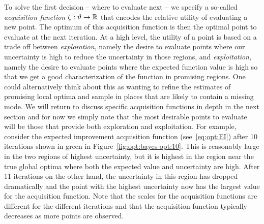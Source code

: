 To solve the first decision -- where to evaluate next -- we specify a so-called 
\emph{acquisition function}  $\zeta : \vartheta \rightarrow \mathbb{R}$
that encodes the relative utility of evaluating a new point.  The optimum of this
acquisition function is then the optimal point to evaluate at the next iteration.
At a high level, the utility
of a point is based on a trade off between \emph{exploration},
namely the desire to evaluate points where our uncertainty is high to reduce the
uncertainty in those regions, and \emph{exploitation}, namely the desire to evaluate points
where the expected function value is high so that we get a good characterization
of the function in promising regions.  One could alternatively think about this as wanting to refine 
the estimates of promising local optima and sample in places that are likely to contain a
missing mode.
We will return to discuss specific acquisition
functions in depth in the next section and for now we simply note that the most
desirable points to evaluate will be those that provide both exploration and exploitation.
For example, consider the expected improvement acquisition function (see~\eqref{eq:opt:EI})
after 10 iterations shown in green in Figure~\ref{fig:opt:bayes-opt:10}.  This is reasonably
large in the two regions of highest uncertainty, but it is highest in the region near the 
true global optima where both
the expected value and uncertainty are high.  After 11 iterations on the other hand,
the uncertainty in this region has dropped dramatically and the point with the
highest uncertainty now has the largest value for the acquisition function.  Note that
the scales for the acquisition functions are different for the different iterations and
that the acquisition function typically decreases as more points are observed.


